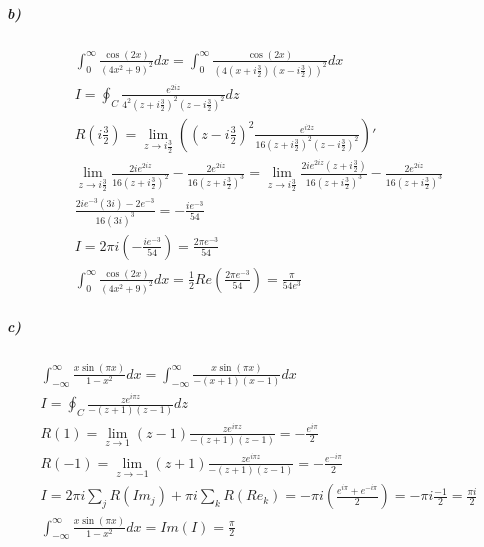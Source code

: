 \documentclass[11pt, A4paper,norsk]{article}
\begin{document}
			\subparagraph{b)}
				\begin{gather*}
\int_{0}^{\infty} \frac{\cos(2x)}{(4x^2 + 9)^2} dx = \int_{0}^{\infty} \frac{\cos(2x)}{\left( 4 \left( x + i \frac{3}{2} \right) \left( x - i \frac{3}{2} \right) \right)^2} dx \\
I = \oint_{C} \frac{e^{2iz}}{4^2 \left( z + i \frac{3}{2} \right)^2 \left( z - i \frac{3}{2} \right)^2} dz \\
R\left( i \frac{3}{2} \right) = \lim_{z \rightarrow i \frac{3}{2}} \left( \left( z - i \frac{3}{2} \right)^{2} \frac{e^{i2z}}{16 \left( z + i \frac{3}{2} \right)^2 \left( z - i \frac{3}{2} \right)^2} \right)' \\
\lim_{z \rightarrow i \frac{3}{2}} \frac{2i e^{2iz}}{16 \left( z + i \frac{3}{2} \right)^2} - \frac{2e^{2iz}}{16 \left( z + i \frac{3}{2} \right)^3} = \lim_{z \rightarrow i \frac{3}{2}} \frac{2i e^{2iz} \left( z + i \frac{3}{2} \right)}{16 \left( z + i \frac{3}{2} \right)^3} - \frac{2e^{2iz}}{16 \left( z + i \frac{3}{2} \right)^3} \\
\frac{2i e^{- 3} ( 3i ) - 2e^{- 3}}{16 ( 3i )^3} = - \frac{i e^{- 3}}{54} \\
I = 2 \pi i \left( - \frac{i e^{-3}}{54} \right) = \frac{2 \pi e^{-3}}{54} \\
\int_{0}^{\infty} \frac{\cos(2x)}{(4x^2 + 9)^2} dx = \frac{1}{2} Re\left( \frac{2 \pi e^{-3}}{54} \right) = \frac{\pi}{54 e^3}
				\end{gather*}









			\subparagraph{c)}
				\begin{gather*}
\int_{- \infty}^{\infty} \frac{x \sin(\pi x)}{1 - x^2} dx = \int_{- \infty}^{\infty} \frac{x \sin(\pi x)}{- (x + 1) (x - 1)} dx \\
I = \oint_{C} \frac{z e^{i \pi z}}{- (z + 1)(z - 1)} dz \\
R(1) = \lim_{z \rightarrow 1} (z - 1) \frac{z e^{i \pi z}}{- (z + 1) (z - 1)} = - \frac{e^{i \pi}}{2} \\
R(- 1) = \lim_{z \rightarrow - 1} (z + 1) \frac{z e^{i \pi z}}{- (z + 1) (z - 1)} = - \frac{e^{- i \pi}}{2} \\
I = 2 \pi i \sum_{j} R(Im_j) + \pi i \sum_{k} R(Re_k) = - \pi i \left( \frac{e^{i \pi} + e^{- i \pi}}{2} \right) = - \pi i \frac{- 1}{2} = \frac{\pi i}{2} \\
\int_{- \infty}^{\infty} \frac{x \sin(\pi x)}{1 - x^2} dx = Im(I) = \frac{\pi}{2}
				\end{gather*}
			
\end{document}
